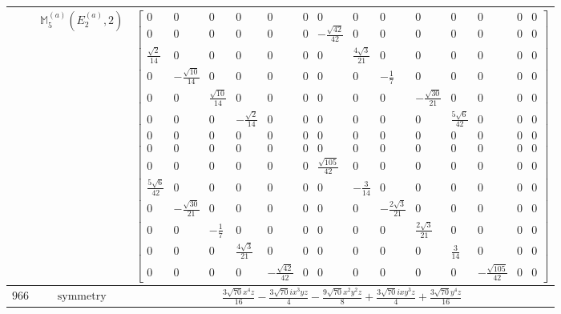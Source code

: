 \documentclass[fleqn,8pt,landscape]{jsarticle}
\begin{document}
\begin{longtable}{ccc}
$  $ & $ \mathbb{M}_{5}^{(a)}(E_{2}^{(a)},2) $ & $ \begin{bmatrix} 0 & 0 & 0 & 0 & 0 & 0 & 0 & 0 & 0 & 0 & 0 & 0 & 0 & 0 \\ 0 & 0 & 0 & 0 & 0 & 0 & - \frac{\sqrt{42}}{42} & 0 & 0 & 0 & 0 & 0 & 0 & 0 \\ \frac{\sqrt{2}}{14} & 0 & 0 & 0 & 0 & 0 & 0 & \frac{4 \sqrt{3}}{21} & 0 & 0 & 0 & 0 & 0 & 0 \\ 0 & - \frac{\sqrt{10}}{14} & 0 & 0 & 0 & 0 & 0 & 0 & - \frac{1}{7} & 0 & 0 & 0 & 0 & 0 \\ 0 & 0 & \frac{\sqrt{10}}{14} & 0 & 0 & 0 & 0 & 0 & 0 & - \frac{\sqrt{30}}{21} & 0 & 0 & 0 & 0 \\ 0 & 0 & 0 & - \frac{\sqrt{2}}{14} & 0 & 0 & 0 & 0 & 0 & 0 & \frac{5 \sqrt{6}}{42} & 0 & 0 & 0 \\ 0 & 0 & 0 & 0 & 0 & 0 & 0 & 0 & 0 & 0 & 0 & 0 & 0 & 0 \\ 0 & 0 & 0 & 0 & 0 & 0 & 0 & 0 & 0 & 0 & 0 & 0 & 0 & 0 \\ 0 & 0 & 0 & 0 & 0 & 0 & \frac{\sqrt{105}}{42} & 0 & 0 & 0 & 0 & 0 & 0 & 0 \\ \frac{5 \sqrt{6}}{42} & 0 & 0 & 0 & 0 & 0 & 0 & - \frac{3}{14} & 0 & 0 & 0 & 0 & 0 & 0 \\ 0 & - \frac{\sqrt{30}}{21} & 0 & 0 & 0 & 0 & 0 & 0 & - \frac{2 \sqrt{3}}{21} & 0 & 0 & 0 & 0 & 0 \\ 0 & 0 & - \frac{1}{7} & 0 & 0 & 0 & 0 & 0 & 0 & \frac{2 \sqrt{3}}{21} & 0 & 0 & 0 & 0 \\ 0 & 0 & 0 & \frac{4 \sqrt{3}}{21} & 0 & 0 & 0 & 0 & 0 & 0 & \frac{3}{14} & 0 & 0 & 0 \\ 0 & 0 & 0 & 0 & - \frac{\sqrt{42}}{42} & 0 & 0 & 0 & 0 & 0 & 0 & - \frac{\sqrt{105}}{42} & 0 & 0 \end{bmatrix} $ \\ \hline
$ 966 $ & $ \text{symmetry} $ & $ \frac{3 \sqrt{70} x^{4} z}{16} - \frac{3 \sqrt{70} i x^{3} y z}{4} - \frac{9 \sqrt{70} x^{2} y^{2} z}{8} + \frac{3 \sqrt{70} i x y^{3} z}{4} + \frac{3 \sqrt{70} y^{4} z}{16} $ \\

\end{longtable}
\end{document}
